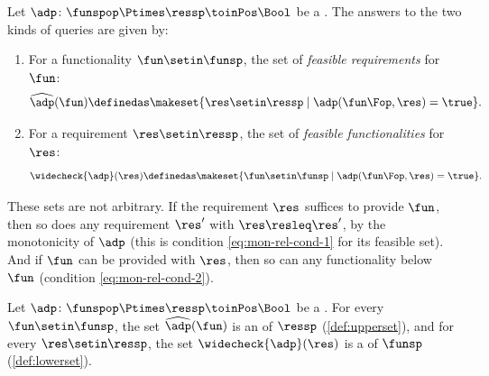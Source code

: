 \begin{definition}
    \label{def:dp-query-sets}
    Let $\adp \colon \funspop \Ptimes \ressp \toinPos \Bool$ be a .
    The answers to the two kinds of queries are given by:

    \constit
    \begin{enumerate}
        \item For a functionality $\fun \setin \funsp$, the set of \emph{feasible requirements} for $\fun$:
              \begin{equation}\label{eq:dp-feasible-requirements}
                  \widehat{\adp}(\fun) \definedas \makeset{ \res \setin \ressp \mid \adp(\fun\Fop, \res) = \true }.
              \end{equation}
        \item For a requirement $\res \setin \ressp$, the set of \emph{feasible functionalities} for $\res$:
              \begin{equation}\label{eq:dp-feasible-functionalities}
                  \widecheck{\adp}(\res) \definedas \makeset{ \fun \setin \funsp \mid \adp(\fun\Fop, \res) = \true }.
              \end{equation}
    \end{enumerate}
\end{definition}

These sets are not arbitrary.
If the requirement $\res$ suffices to provide $\fun$, then so does any requirement $\res'$ with $\res \resleq \res'$, by the monotonicity of $\adp$ (this is condition \cref{eq:mon-rel-cond-1} for its feasible set).
And if $\fun$ can be provided with $\res$, then so can any functionality below $\fun$ (condition \cref{eq:mon-rel-cond-2}).

\begin{lemma}
    \label{lem:dp-query-sets}
    Let $\adp \colon \funspop \Ptimes \ressp \toinPos \Bool$ be a .
    For every $\fun \setin \funsp$, the set $\widehat{\adp}(\fun)$ is an  of $\ressp$ (\cref{def:upperset}), and for every $\res \setin \ressp$, the set $\widecheck{\adp}(\res)$ is a  of $\funsp$ (\cref{def:lowerset}).
\end{lemma}
%

